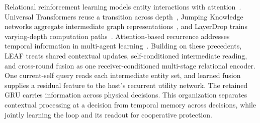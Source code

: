 Relational reinforcement learning models entity interactions with attention~\cite{zambaldi2019relational}. Universal Transformers reuse a transition across depth~\cite{dehghani2019universal}, Jumping Knowledge networks aggregate intermediate graph representations~\cite{xu2018jk}, and LayerDrop trains varying-depth computation paths~\cite{fan2020layerdrop}. Attention-based recurrence addresses temporal information in multi-agent learning~\cite{phan2023aerial}. Building on these precedents, LEAF treats shared contextual updates, self-conditioned intermediate reading, and cross-round fusion as one receiver-conditioned multi-stage relational encoder. One current-self query reads each intermediate entity set, and learned fusion supplies a residual feature to the host's recurrent utility network. The retained GRU carries information across physical decisions. This organization separates contextual processing at a decision from temporal memory across decisions, while jointly learning the loop and its readout for cooperative protection.
